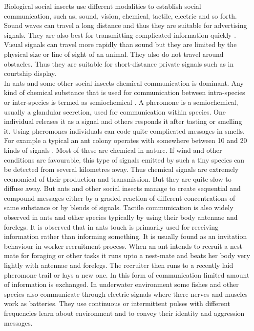 Biological social insects use different modalities to establish social communication, such as, sound, vision, chemical, tactile,  electric and so forth.  Sound waves can travel a long distance and thus they are suitable for advertising signals. They are also best for transmitting complicated information quickly \cite{Slater1986}. Visual signals can travel more rapidly than sound but they are limited by the physical size or line of sight of an animal. They also do not travel around obstacles. Thus they are suitable for short-distance private signals such as in courtship display.\\
% 
In ants and some other social insects chemical communication is dominant. Any kind of chemical substance that is used for communication between intra-species or inter-species is termed as semiochemical \cite{Holldobler1990}. A pheromone is a semiochemical, usually a glandular secretion, used for communication within species. One individual releases it as a signal and others responds it after tasting or smelling it. Using pheromones individuals can code quite complicated messages in smells. For example a typical an ant colony operates with somewhere between 10 and 20 kinds of signals \cite{Holldobler1990}. Most of these are chemical in nature. If wind and other conditions are favourable,  this type of signals emitted by such a tiny species can be detected from several kilometres away. Thus chemical signals are extremely economical of their production and transmission. But they are quite slow to diffuse away. But ants and other social insects manage to create sequential and compound messages either by a graded reaction of different concentrations of same substance or by blends of signals.
Tactile communication is also widely observed in ants and other species typically by using their body antennae and forelegs. It is observed that in ants touch is primarily used  for receiving information rather than informing something. It is usually found as an invitation behaviour in worker recruitment process. When an ant intends to recruit a nest-mate for foraging or other tasks it runs upto a nest-mate and beats her body very lightly with  antennae and forelegs. The recruiter then runs to a recently laid pheromone trail or lays a new one. In this form of communication limited amount of information is exchanged. In underwater environment some fishes and other species also communicate through electric signals where there nerves and muscles work as batteries. They use continuous or intermittent pulses with  different frequencies learn about environment and to convey their identity and aggression messages.
%
